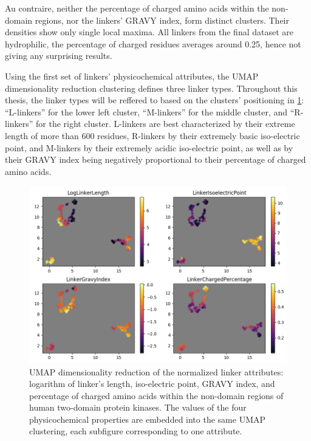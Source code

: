 		Au contraire, neither the percentage of charged amino acids within the non-domain
		regions, nor the linkers' GRAVY index, form distinct clusters.
		Their densities show only single local maxima.
		All linkers from the final dataset are hydrophilic, the percentage of charged residues
		averages around 0.25, hence not giving any surprising results.

	\label{res:first:umap}

		Using the first set of linkers' physicochemical attributes, the UMAP dimensionality
		reduction clustering defines three linker types.
		Throughout this thesis, the linker types will be reffered to based on the clusters'
		positioning in \cref{fig:umap}: ``L-linkers'' for the lower left cluster,
		``M-linkers'' for the middle cluster, and ``R-linkers'' for the right cluster.
		L-linkers are best characterized by their extreme length of more than 600 residues,
		R-linkers by their extremely basic iso-electric point, and M-linkers by their
		extremely acidic iso-electric point, as well as by their GRAVY index being negatively
		proportional to their percentage of charged amino acids.

		\begin{figure}
			\centering
			\includegraphics[width=\linewidth]{img/linker_umap.png}
			\caption{UMAP dimensionality reduction of the normalized linker attributes:
			logarithm of linker's length, iso-electric point, GRAVY index, and percentage of
			charged amino acids within the non-domain regions of human two-domain protein
			kinases. The values of the four physicochemical properties are embedded into the
			same UMAP clustering, each subfigure corresponding to one attribute.}
			\label{fig:umap}
		\end{figure}

